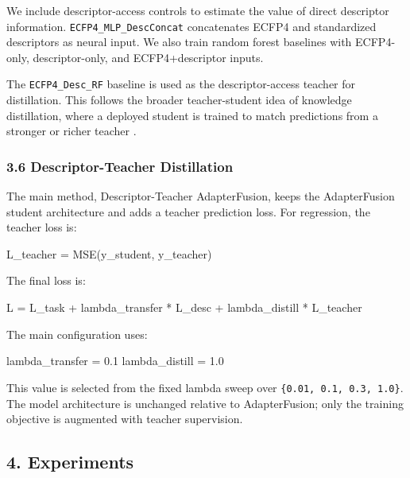 \documentclass[
]{article}
\newenvironment{Shaded}{}{}
\newcommand{\NormalTok}[1]{#1}
\begin{document}
We include descriptor-access controls to estimate the value of direct
descriptor information. \texttt{ECFP4\_MLP\_DescConcat} concatenates
ECFP4 and standardized descriptors as neural input. We also train random
forest baselines with ECFP4-only, descriptor-only, and ECFP4+descriptor
inputs.

The \texttt{ECFP4\_Desc\_RF} baseline is used as the descriptor-access
teacher for distillation. This follows the broader teacher-student idea
of knowledge distillation, where a deployed student is trained to match
predictions from a stronger or richer teacher \citep{Hinton2015}.

\subsubsection{3.6 Descriptor-Teacher
Distillation}\label{descriptor-teacher-distillation}

The main method, Descriptor-Teacher AdapterFusion, keeps the
AdapterFusion student architecture and adds a teacher prediction loss.
For regression, the teacher loss is:

\begin{Shaded}
\begin{Highlighting}[]
\NormalTok{L\_teacher = MSE(y\_student, y\_teacher)}
\end{Highlighting}
\end{Shaded}

The final loss is:

\begin{Shaded}
\begin{Highlighting}[]
\NormalTok{L = L\_task + lambda\_transfer * L\_desc + lambda\_distill * L\_teacher}
\end{Highlighting}
\end{Shaded}

The main configuration uses:

\begin{Shaded}
\begin{Highlighting}[]
\NormalTok{lambda\_transfer = 0.1}
\NormalTok{lambda\_distill = 1.0}
\end{Highlighting}
\end{Shaded}

This value is selected from the fixed lambda sweep over
\texttt{\{0.01,\ 0.1,\ 0.3,\ 1.0\}}. The model architecture is unchanged
relative to AdapterFusion; only the training objective is augmented with
teacher supervision.

\subsection{4. Experiments}\label{experiments}
\end{document}
